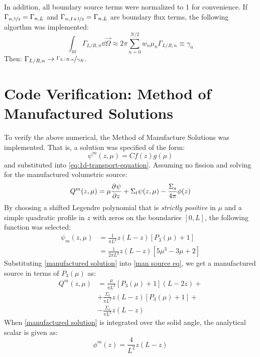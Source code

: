 \documentclass{NE515}
\theoremstyle{definition}
\begin{document}
    In addition, all boundary source terms were normalized to 1 for convenience.
    If $\Gamma_{n,\nicefrac{1}{2}}=\Gamma_{n,L}$ and $\Gamma_{n,I+\nicefrac{1}{2}}=\Gamma_{n,L}$ are boundary flux terms, the following algorthm was implemented:
    \begin{equation}
        \label{numerical flux scaling}
        \int_{4\pi }^{} \Gamma_{L/R,n}\dd \vec{\Omega} \approx 2\pi \sum_{n=0}^{N/2} w_n\mu_n \Gamma_{L/R,n}\equiv \gamma_n
    \end{equation}
    Then: $\Gamma_{L/R,n}\rightarrow \nicefrac{\Gamma_{L/R,n}}{\gamma_N}$.


    \section{Code Verification: Method of Manufactured Solutions}
    To verify the above numerical, the Method of Manufacture Solutions was implemented.
    That is, a solution was specified of the form:
    \begin{equation}
        \psi^m (z,\mu) = C f(z) g(\mu)
    \end{equation}
    and substituted into \cref{eq:1d-transport-equation}.
    Assuming no fission and solving for the manufactured volumetric source:
    \begin{equation}
        \label{man source eq}
        Q^m(z,\mu) = \mu \pdv[]{\psi }{z}+\Sigma_t\psi(z,\mu)-\frac{\Sigma_s}{4\pi}\phi(z)
    \end{equation}
    By choosing a shifted Legendre polynomial that is \textit{strictly positive} in $\mu$ and a simple quadratic profile in $z$ with zeros on the boundaries $[0,L]$, the following function was selected:
    \begin{equation}
        \label{manufactured solution}
        \begin{split}
            \psi_{m}(z,\mu)&=\frac{1}{\pi L^2}z(L-z)\left[ P_3 (\mu)+1\right]\\
            &= \frac{1}{2\pi L^2}z(L-z)\left[ 5\mu^3-3\mu+2\right]
        \end{split}
    \end{equation}
    Substituting \cref{manufactured solution} into \cref{man source eq}, we get a manufactured source in terms of $P_3(\mu)$ as:
    \begin{equation}
        \begin{split}
            Q^m(z,\mu)&=\frac{\mu }{\pi L^2}\left[ P_3(\mu)+1 \right]\left( L-2z \right) +\\
            &+\frac{\Sigma_t}{\pi L^2}z\left( L-z \right)\left[ P_3(\mu)+1 \right]+\\
            &-\frac{\Sigma_s}{\pi L^2}z\left( L-z \right)
        \end{split}
    \end{equation}
    When \cref{manufactured solution} is integrated over the solid angle, the analytical scalar is given as:
    \begin{equation}
        \phi^m(z)=\frac{4}{L^2}z\left( L-z \right)
    \end{equation}
\end{document}

